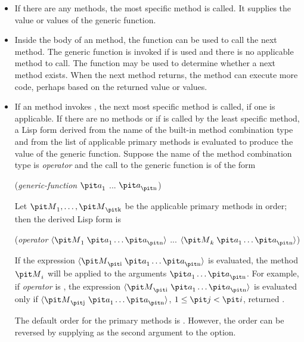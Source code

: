 \begin{itemize}
\item 
If there are any  methods, the most specific 
method is called.   It supplies the value or values of the generic function. 

\item  Inside the body of an  method, the function
 can be used to call the next method.  The
generic function  is invoked if 
 is used and there is no applicable method to call.
The function  may be used to determine whether a
next method exists. When the next method returns, the 
method can execute more code, perhaps based on the returned value or
values.

\item  If an  method invokes 
, the next most specific  method is
called, if one is applicable.  If there are no  methods
or if  is called by the least specific 
 method, a Lisp form derived from the name of the built-in
method combination type and from the list of applicable primary
methods is evaluated to produce the value of the generic function.
Suppose the name of the method combination type is {\it operator\/}
and the call to the generic function is of the form
\begin{lisp}
({\it generic-function\/} ${\it a}\sub 1$ ... ${\it a}\sub {\hbox{\scriptsize\it n}}$)
\end{lisp}
Let ${\it M}\sub 1,\ldots,{\it M}\sub {\hbox{\scriptsize\it k}}$ be the applicable primary methods
in order; then the derived Lisp form is
\begin{lisp}
({\it operator\/} $\langle {\it M}\sub 1\;{\it a}\sub 1\ldots {\it a}\sub {\hbox{\scriptsize\it n}}\rangle$
... $\langle {\it M}\sub k\;{\it a}\sub 1\ldots {\it a}\sub {\hbox{\scriptsize\it n}}\rangle$)
\end{lisp}
If the expression $\langle {\it M}\sub {\hbox{\scriptsize\it i}} \;{\it a}\sub 1\ldots {\it a}\sub
{\hbox{\scriptsize\it n}}\rangle$ is
evaluated, the method ${\it M}\sub i$ will be applied to the arguments
${\it a}\sub 1\ldots {\it a}\sub {\hbox{\scriptsize\it n}}$.  
For example,
if {\it operator\/} is ,
the expression $\langle {\it M}\sub{\hbox{\scriptsize\it i}} \ {\it a}\sub 1\ldots {\it a}\sub {\hbox{\scriptsize\it n}}\rangle$ is
evaluated only if $\langle {\it M}\sub {\hbox{\scriptsize\it j}} \ {\it a}\sub 1\ldots {\it a}\sub {\hbox{\scriptsize\it n}}\rangle$,
$1\leq {\it j}<{\it i}$, returned .

The default order for the primary methods is 
.  However, the order can be reversed by supplying
 as the second argument to the 
 option.

\end{itemize}


